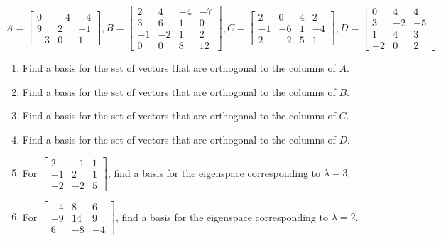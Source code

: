 \begin{enumerate}
$$
A= \begin{bmatrix}
 0 & -4 & -4 \\
 9 & 2 & -1 \\
 -3 & 0 & 1
\end{bmatrix}
,
B=\begin{bmatrix}
 2 & 4 & -4 & -7 \\
 3 & 6 & 1 & 0 \\
 -1 & -2 & 1 & 2 \\
 0 & 0 & 8 & 12
\end{bmatrix}
,
C=
\begin{bmatrix}
 2 & 0 & 4 & 2 \\
 -1 & -6 & 1 & -4 \\
 2 & -2 & 5 & 1
\end{bmatrix}
, 
D=
\begin{bmatrix}
 0 & 4 & 4 \\
 3 & -2 & -5 \\
 1 & 4 & 3 \\
 -2 & 0 & 2
\end{bmatrix}
$$

\begin{enumerate}
\item Find a basis for the set of vectors that are orthogonal to the columns of $A$.
\item Find a basis for the set of vectors that are orthogonal to the columns of $B$.
\item Find a basis for the set of vectors that are orthogonal to the columns of $C$.
\item Find a basis for the set of vectors that are orthogonal to the columns of $D$.

\item For
$
\begin{bmatrix}
 2 & -1 & 1 \\
 -1 & 2 & 1 \\
 -2 & -2 & 5
\end{bmatrix}
$, find a basis for the eigenspace corresponding to $\lambda = 3$.

\item For
$
\begin{bmatrix}
 -4 & 8 & 6 \\
 -9 & 14 & 9 \\
 6 & -8 & -4
\end{bmatrix}
$, find a basis for the eigenspace corresponding to $\lambda = 2$.





\end{enumerate}
\end{enumerate}
